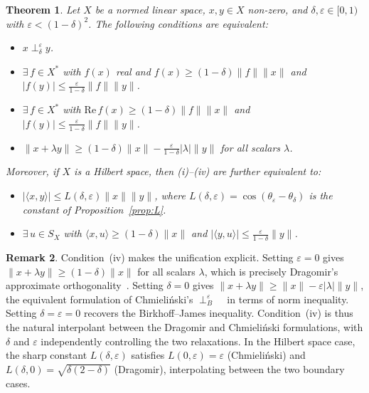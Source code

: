 \documentclass[11pt, reqno]{amsart}
\newtheorem{theorem}{Theorem}[section]
\theoremstyle{definition}
\newtheorem{remark}[theorem]{Remark}
\newcommand{\nperp}{\perp_{\delta}^\varepsilon}
\begin{document}
\begin{theorem}\label{Thm:Equiv}
Let $X$ be a normed linear space, $x, y \in X$ non-zero, and $\delta, \varepsilon 
\in [0,1)$ with $\varepsilon < (1-\delta)^2$. The following conditions are equivalent:
\begin{itemize}
    \item[(i)] $x \nperp y$.
    \item[(ii)] $\exists\, f \in X^*$ with $f(x)$ real and $f(x) \geq (1-\delta)\|f\|\|x\|$ 
    and $|f(y)| \leq \frac{\varepsilon}{1-\delta}\|f\|\|y\|$.
    \item[(iii)] $\exists\, f \in X^*$ with $\mathrm{Re}\,f(x) \geq (1-\delta)\|f\|\|x\|$ 
    and $|f(y)| \leq \frac{\varepsilon}{1-\delta}\|f\|\|y\|$.
    \item[(iv)] $\|x + \lambda y\| \geq (1-\delta)\|x\| - 
    \frac{\varepsilon}{1-\delta}|\lambda|\|y\|$ for all scalars $\lambda$.
\end{itemize}
Moreover, if $X$ is a Hilbert space, then \emph{(i)--(iv)} are further equivalent to:
\begin{itemize}
    \item[(v)] $|\langle x, y\rangle| \leq L(\delta,\varepsilon)\|x\|\|y\|$, where
$L(\delta,\varepsilon)=\cos(\theta_\varepsilon-\theta_\delta)$ is the constant of Proposition~\ref{prop:L}.
   \item[(vi)] $\exists\, u \in S_X$ with $\langle x, u\rangle \geq (1-\delta)\|x\|$ 
    and $|\langle y, u\rangle| \leq \frac{\varepsilon}{1-\delta}\|y\|$.
\end{itemize}
\end{theorem}

\begin{remark}\label{rem:unification}
Condition~(iv) makes the unification explicit. Setting $\varepsilon = 0$ 
gives $\|x + \lambda y\| \geq (1-\delta)\|x\|$ for all scalars $\lambda$, 
which is precisely Dragomir's approximate orthogonality~\cite{Drag}. Setting 
$\delta = 0$ gives $\|x + \lambda y\| \geq \|x\| - \varepsilon|\lambda|\|y\|$, 
the equivalent formulation of Chmieli\'nski's $\perp_B^\varepsilon$ ~\cite{Chm2, Alt} in terms of norm inequality. Setting $\delta = \varepsilon = 0$ recovers 
the Birkhoff--James inequality. Condition~(iv) is thus the natural 
interpolant between the Dragomir and Chmieli\'nski formulations, with $\delta$ 
and $\varepsilon$ independently controlling the two relaxations. In the Hilbert 
space case, the sharp constant $L(\delta,\varepsilon)$ satisfies 
$L(0,\varepsilon) = \varepsilon$ (Chmieli\'nski) and 
$L(\delta,0) = \sqrt{\delta(2-\delta)}$ (Dragomir), interpolating between 
the two boundary cases.
\end{remark}
\end{document}
